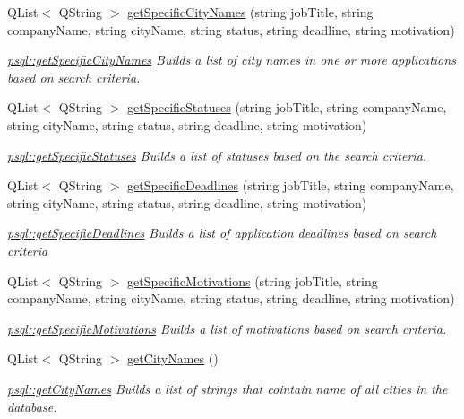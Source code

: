 \begin{DoxyCompactItemize}
Q\+List$<$ Q\+String $>$ \mbox{\hyperlink{classpsql_aace910a1e695138795d6e41765908784}{get\+Specific\+City\+Names}} (string job\+Title, string company\+Name, string city\+Name, string status, string deadline, string motivation)
\begin{DoxyCompactList}\small\item\em \mbox{\hyperlink{classpsql_aace910a1e695138795d6e41765908784}{psql\+::get\+Specific\+City\+Names}} Builds a list of city names in one or more applications based on search criteria. \end{DoxyCompactList}\item 
Q\+List$<$ Q\+String $>$ \mbox{\hyperlink{classpsql_aa04154eae71d7cdfd0fb8ab67ac032e7}{get\+Specific\+Statuses}} (string job\+Title, string company\+Name, string city\+Name, string status, string deadline, string motivation)
\begin{DoxyCompactList}\small\item\em \mbox{\hyperlink{classpsql_aa04154eae71d7cdfd0fb8ab67ac032e7}{psql\+::get\+Specific\+Statuses}} Builds a list of statuses based on the search criteria. \end{DoxyCompactList}\item 
Q\+List$<$ Q\+String $>$ \mbox{\hyperlink{classpsql_a415ebb495b96ac805880401555f72825}{get\+Specific\+Deadlines}} (string job\+Title, string company\+Name, string city\+Name, string status, string deadline, string motivation)
\begin{DoxyCompactList}\small\item\em \mbox{\hyperlink{classpsql_a415ebb495b96ac805880401555f72825}{psql\+::get\+Specific\+Deadlines}} Builds a list of application deadlines based on search criteria \end{DoxyCompactList}\item 
Q\+List$<$ Q\+String $>$ \mbox{\hyperlink{classpsql_a7c86e4ba33784dece1bf897537087a68}{get\+Specific\+Motivations}} (string job\+Title, string company\+Name, string city\+Name, string status, string deadline, string motivation)
\begin{DoxyCompactList}\small\item\em \mbox{\hyperlink{classpsql_a7c86e4ba33784dece1bf897537087a68}{psql\+::get\+Specific\+Motivations}} Builds a list of motivations based on search criteria. \end{DoxyCompactList}\item 
Q\+List$<$ Q\+String $>$ \mbox{\hyperlink{classpsql_a42ee0cf90055ba6a7a6f564cf04d8bb8}{get\+City\+Names}} ()
\begin{DoxyCompactList}\small\item\em \mbox{\hyperlink{classpsql_a42ee0cf90055ba6a7a6f564cf04d8bb8}{psql\+::get\+City\+Names}} Builds a list of strings that cointain name of all cities in the database. \end{DoxyCompactList}\item 

\end{DoxyCompactItemize}
